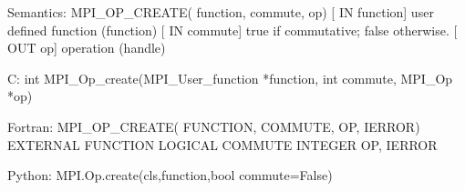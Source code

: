 Semantics:
MPI_OP_CREATE( function, commute, op)
[ IN function] user defined function (function)
[ IN commute] true if commutative; false otherwise.
[ OUT op] operation (handle)

C:
int MPI_Op_create(MPI_User_function *function, int commute,
    MPI_Op *op)

Fortran:
MPI_OP_CREATE( FUNCTION, COMMUTE, OP, IERROR)
EXTERNAL FUNCTION
LOGICAL COMMUTE
INTEGER OP, IERROR

Python:
MPI.Op.create(cls,function,bool commute=False)
